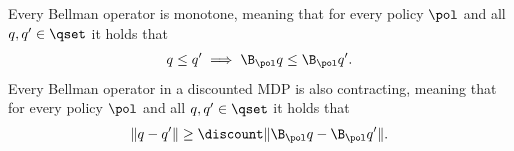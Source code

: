 \begin{property} 
Every Bellman operator is monotone, meaning that for every policy $\pol$ and all $q, q' \in \qset$ it holds that
\begin{align*}
    q \leq q' \implies \B_\pol q \leq \B_\pol q' .
\end{align*}
% 
Every Bellman operator in a discounted MDP is also contracting, meaning that 
for every policy $\pol$ and all $q, q' \in \qset$ it holds that
\begin{align*}
    \|q - q'\| \geq \discount \|\B_\pol q - \B_\pol q'\| .
\end{align*}
\end{property}